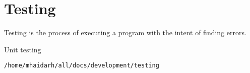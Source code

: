 \section{Testing}
\label{sec:testing}

Testing is the process of executing a program with the intent of finding errors.~\autocite{Myers:2012:Testing:6}

Unit testing

\verb|/home/mhaidarh/all/docs/development/testing|


